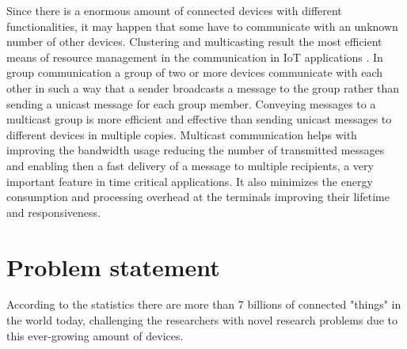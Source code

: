 Since there is a enormous amount of connected devices with different functionalities, it may happen that some have to communicate with an unknown number of other devices.
Clustering and multicasting result the most efficient means of resource management in the communication in IoT applications \cite{Klaoudatou2011AWSNs}.
In group communication a group of two or more devices communicate with each other in such a way that a sender broadcasts a message to the group rather than sending a unicast message for each group member.
Conveying messages to a multicast group is more efficient and effective than sending unicast messages to different devices in multiple copies. 
Multicast communication helps with improving the bandwidth usage reducing the number of transmitted messages and enabling then a fast delivery of a message to multiple recipients, a very important feature in time critical applications.
It also minimizes the energy consumption and processing overhead at the terminals improving their lifetime and responsiveness. 


\section{Problem statement}
\label{sec:problemstatement}

According to the statistics \cite{statIoT} there are more than 7 billions of connected "things" in the world today, challenging the researchers with novel research problems due to this ever-growing amount of devices. 

